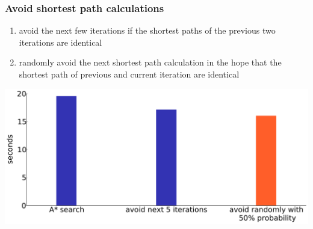 \documentclass{beamer}
\begin{document}
\begin{frame}
    \frametitle{Avoid shortest path calculations}
    \begin{enumerate}
        \item avoid the next few iterations if the shortest paths of the previous two iterations are identical
        \item randomly avoid the next shortest path calculation in the hope that the shortest path of previous and current iteration are identical
    \end{enumerate}
    \begin{center}
        \includegraphics[width=.9\textwidth, keepaspectratio]{img/random_runtime}
    \end{center}
\end{frame}
\end{document}
